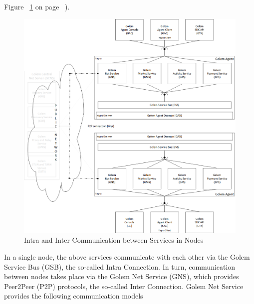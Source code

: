 
Figure ~\ref{fig:SCR} on page ~\pageref{fig:SCR}).

\begin{figure}[H]
    \centering
    \includegraphics[width=12cm,angle=0]{./diag/Reference/ServicesConcept-Reference.png}
	\caption{Intra and Inter Communication between Services in Nodes}
    \label{fig:SCR}
\end{figure}


In a single node, the above services communicate with each other via the Golem Service Bus (GSB), the so-called Intra Connection.
In turn, communication between nodes takes place via the Golem Net Service (GNS), which provides Peer2Peer (P2P) protocols, the so-called Inter Connection.
Golem Net Service provides the following communication models

